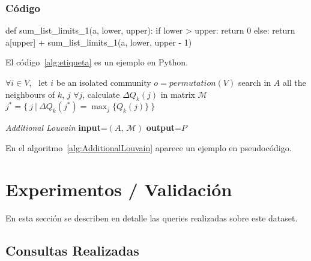\documentclass[12pt,twoside,titlepage]{report}
\newcommand\blankpage{%
    \newpage
    \null
    \thispagestyle{empty}%
    \newpage}
\begin{document}
\newpage



\subsection{Código}


\begin{mypython}[float={!t},caption={Titulo del algoritmo/código.},label={alg:etiqueta}]
def sum_list_limits_1(a, lower, upper):
    if lower > upper:
        return 0
    else:
        return a[upper] + sum_list_limits_1(a, lower, upper - 1)
\end{mypython}
El código~\ref{alg:etiqueta} es un ejemplo en Python.



\begin{algorithm}
\begin{algorithmic}[1]
\STATE $\forall i \in V$, \ let $i$ be an isolated community
\STATE $o=permutation(V)$
\STATE search in $A$ all the neighbours of $k$, $j$
\STATE $\forall j$, calculate $\Delta Q_k(j)$ in matrix $\mathcal{M}$
\STATE $j^*=\{ \ j \ | \ \Delta Q_k(j^*)=\max_j\{Q_k(j)\} \ \}$
\ELSE
{}
\ENDIF
\ENDFOR
\end{algorithmic}\caption{\textit{Additional Louvain} \textbf{input}=$\left(A, \ \mathcal{M}\right)$ \textbf{output}=$P$}
\label{alg:AdditionalLouvain}
\end{algorithm}
En el algoritmo~\ref{alg:AdditionalLouvain} aparece un ejemplo en pseudocódigo.











\chapter{Experimentos / Validación}
\label{sec:expVal}


En esta sección se describen en detalle las queries realizadas sobre este dataset.


\blankpage

\section{Consultas Realizadas}
\end{document}
